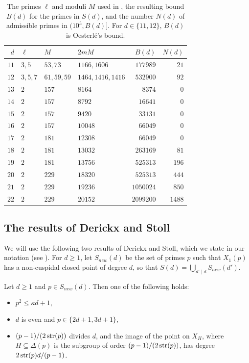 \begin{table}[H]
\centering
\begin{tabular}{rlllrr}
\toprule
$d$ & $\ell$ & $M$ & $2mM$ & $B(d)$ & $N(d)$\\
\midrule
$11$ & $3,5$ & $53,73$ & $1166,1606$ & $177989$ & $21$\\
$12$ & $3,5,7$ & $61,59,59$ & $1464,1416,1416$ & $532900$ & $92$\\
$13$ & $2$ & $157$ & $8164$ & $8374$ & $0$\\
$14$ & $2$ & $157$ & $8792$ & $16641$ & $0$\\
$15$ & $2$ & $157$ & $9420$ & $33131$ & $0$\\
$16$ & $2$ & $157$ & $10048$ & $66049$ & $0$\\
$17$ & $2$ & $181$ & $12308$ & $66049$ & $0$\\
$18$ & $2$ & $181$ & $13032$ & $263169$ & $81$\\
$19$ & $2$ & $181$ & $13756$ & $525313$ & $196$\\
$20$ & $2$ & $229$ & $18320$ & $525313$ & $444$\\
$21$ & $2$ & $229$ & $19236$ & $1050024$ & $850$\\
$22$ & $2$ & $229$ & $20152$ & $2099200$ & $1488$\\
\bottomrule
\end{tabular}
\medskip
\caption{The primes $\ell$ and moduli $M$ used in , the resulting bound $B(d)$ for the primes in $S(d)$, and the number $N(d)$ of admissible primes in $(10^5,B(d)]$. For $d\in\{11,12\}$, $B(d)$ is Oesterl\'e's bound.}
\label{table:bound}
\end{table}

\subsection{The results of Derickx and Stoll}
We will use the following two results of Derickx and Stoll, which we state in our notation (see ). For $d\geq 1$, let $S_{new}(d)$ be the set of primes $p$ such that $X_1(p)$ has a non-cuspidal closed point of degree $d$, so that $S(d)=\bigcup_{d'\mid d}S_{new}(d')$.

\begin{proposition}\label{prop:DS75}
Let $d\geq1$ and $p\in S_{new}(d)$. Then one of the following holds:
\begin{itemize}
\item[a)] $p^2\leq \kappa d+1$,
\item[b)] $d$ is even and $p\in\{2d+1,3d+1\}$,
\item[c)] $(p-1)/(2\operatorname{str}(p))$ divides $d$, and the image of the point on $X_H$, where $H\subseteq\Delta(p)$ is the subgroup of order $(p-1)/(2\operatorname{str}(p))$, has degree $2\operatorname{str}(p)d/(p-1)$.
\end{itemize}
\end{proposition}

